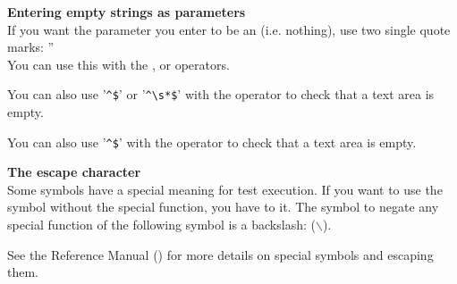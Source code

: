 
\textbf{Entering empty strings as parameters}\\
If you want the parameter you enter to be an  (i.e. nothing), use two single quote marks: ''\\

You can use this with the ,  or  operators.

You can also use '\verb+^$+' or '\verb+^\s*$+' with the operator  to check that a text area is empty.  

You can also use '\verb+^$+' with the operator  to check that a text area is empty.  


\textbf{The escape character}\\
Some symbols have a special meaning for test execution. If you want to use the symbol without the special function, you have to  it. The symbol to negate any special function of the following symbol is a backslash: ($\backslash$). 
                          
See the Reference Manual () for more details on special symbols and escaping them.


